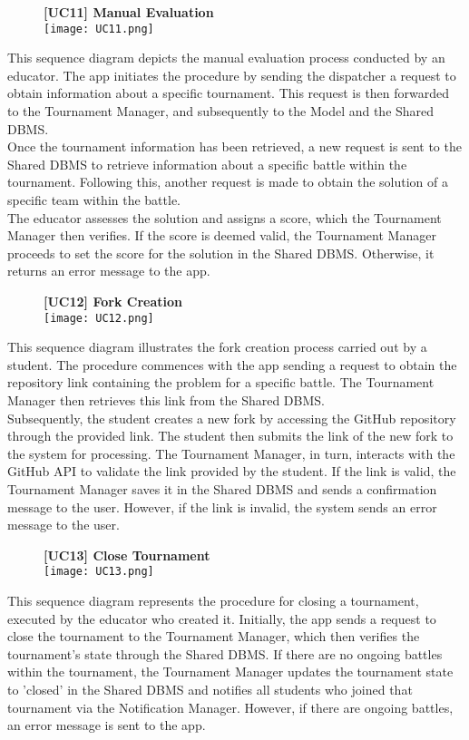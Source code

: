 \documentclass{article}
\begin{document}
\begin{figure}[H]
    \centering
    \textbf{[UC11] Manual Evaluation} \\
    \texttt{[image: UC11.png]}
\end{figure}
\noindent
This sequence diagram depicts the manual evaluation process conducted by an educator. The app initiates the procedure by sending the dispatcher a request to obtain information about a specific tournament. This request is then forwarded to the Tournament Manager, and subsequently to the Model and the Shared DBMS. \\
Once the tournament information has been retrieved, a new request is sent to the Shared DBMS to retrieve information about a specific battle within the tournament. Following this, another request is made to obtain the solution of a specific team within the battle. \\
The educator assesses the solution and assigns a score, which the Tournament Manager then verifies. If the score is deemed valid, the Tournament Manager proceeds to set the score for the solution in the Shared DBMS. Otherwise, it returns an error message to the app. \\


\begin{figure}[H]
    \centering
    \textbf{[UC12] Fork Creation} \\
    \texttt{[image: UC12.png]}
\end{figure}
\noindent
This sequence diagram illustrates the fork creation process carried out by a student. The procedure commences with the app sending a request to obtain the repository link containing the problem for a specific battle. The Tournament Manager then retrieves this link from the Shared DBMS. \\
Subsequently, the student creates a new fork by accessing the GitHub repository through the provided link. The student then submits the link of the new fork to the system for processing. The Tournament Manager, in turn, interacts with the GitHub API to validate the link provided by the student. If the link is valid, the Tournament Manager saves it in the Shared DBMS and sends a confirmation message to the user. However, if the link is invalid, the system sends an error message to the user.

\begin{figure}[H]
    \centering
    \textbf{[UC13] Close Tournament} \\
    \texttt{[image: UC13.png]}
\end{figure}
\noindent
This sequence diagram represents the procedure for closing a tournament, executed by the educator who created it. Initially, the app sends a request to close the tournament to the Tournament Manager, which then verifies the tournament's state through the Shared DBMS. If there are no ongoing battles within the tournament, the Tournament Manager updates the tournament state to 'closed' in the Shared DBMS and notifies all students who joined that tournament via the Notification Manager. However, if there are ongoing battles, an error message is sent to the app.
\end{document}
